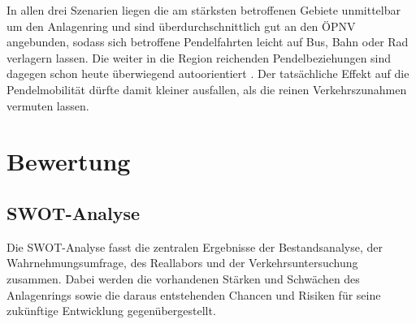 \documentclass[a4paper,12pt]{article}
\begin{document}
In allen drei Szenarien liegen die am stärksten betroffenen Gebiete unmittelbar um den Anlagenring und sind überdurchschnittlich gut an den ÖPNV angebunden, sodass sich betroffene Pendelfahrten leicht auf Bus, Bahn oder Rad verlagern lassen. Die weiter in die Region reichenden Pendelbeziehungen sind dagegen schon heute überwiegend autoorientiert \autocite{stadtfrankfurtzieleverfahren2025}. Der tatsächliche Effekt auf die Pendelmobilität dürfte damit kleiner ausfallen, als die reinen Verkehrszunahmen vermuten lassen.

\section{Bewertung}

\subsection{SWOT-Analyse}

Die SWOT-Analyse fasst die zentralen Ergebnisse der Bestandsanalyse, der Wahrnehmungsumfrage, des Reallabors und der Verkehrsuntersuchung zusammen. Dabei werden die vorhandenen Stärken und Schwächen des Anlagenrings sowie die daraus entstehenden Chancen und Risiken für seine zukünftige Entwicklung gegenübergestellt.
\end{document}
